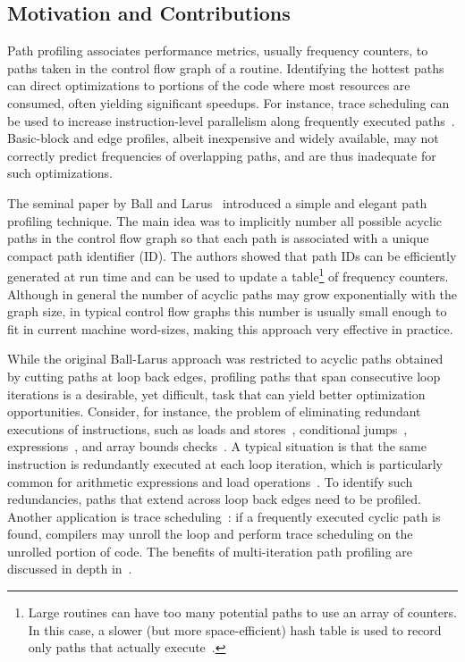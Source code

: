 \subsection{Motivation and Contributions}

Path profiling associates performance metrics, usually frequency counters, to paths taken in the control flow graph of a routine. Identifying the hottest paths can direct optimizations to portions of the code where most resources are consumed, often yielding significant speedups. For instance, trace scheduling can be used to increase instruction-level parallelism along frequently executed paths~\cite{Fisher81,Young98}. Basic-block and edge profiles, albeit inexpensive and widely available, may not correctly predict frequencies of overlapping paths, and are thus inadequate for such optimizations.

The seminal paper by Ball and Larus~\cite{Ball96} introduced a simple and elegant path profiling technique. The main idea was to implicitly number all possible acyclic paths in the control flow graph so that each path is associated with a unique compact path identifier (ID). The authors showed that path IDs can be efficiently generated at run time and can be used to update a table\footnote{Large routines can have too many potential paths to use an array of counters. In this case, a slower (but more space-efficient) hash table is used to record only paths that actually execute~\cite{Ball96}.} of frequency counters. Although in general the number of acyclic paths may grow exponentially with the graph size, in typical control flow graphs this number is usually small enough to fit in current machine word-sizes, making this approach very effective in practice.

While the original Ball-Larus approach was restricted to acyclic paths obtained by cutting paths at loop back edges, profiling paths that span consecutive loop iterations is a desirable, yet difficult, task that can yield better optimization opportunities. Consider, for instance, the problem of eliminating redundant executions of instructions, such as loads and stores~\cite{Bodik99}, conditional jumps~\cite{Bodik97}, expressions~\cite{Bodik98,Bodik04}, and array bounds checks~\cite{Bodik00}. A typical situation is that the same instruction is redundantly executed at each loop iteration, which is particularly common for arithmetic expressions and load operations~\cite{Bodik04,Bodik99}. To identify such redundancies, paths that extend across loop back edges need to be profiled. Another application is trace scheduling~\cite{Young98}: if a frequently executed cyclic path is found, compilers may unroll the loop and perform trace scheduling on the unrolled portion of code. The benefits of multi-iteration path profiling are discussed in depth in~\cite{Tallam04}.

